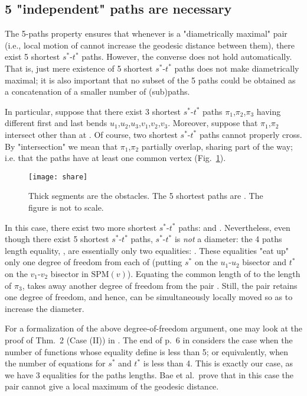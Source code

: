 \documentclass{llncs}
\newif\ifim \imtrue
\newcommand{\e}[1]{\emph{#1}}
\renewcommand\-{\textrm{-}}
\newcommand{\spm}[1]{\ensuremath{\textrm{SPM}(#1)}\xspace}
\renewcommand\ss{\ensuremath{s^*}\xspace}
\renewcommand\tt{\ensuremath{t^*}\xspace}
\newcommand{\uone}{\ensuremath{u_1}\xspace}\newcommand{\utwo}{\ensuremath{u_2}\xspace}\newcommand{\uthree}{\ensuremath{u_3}\xspace}
\newcommand{\vone}{\ensuremath{v_1}\xspace}\newcommand{\vtwo}{\ensuremath{v_2}\xspace}\newcommand{\vthree}{\ensuremath{v_3}\xspace}
\newcommand\pone{\ensuremath{\pi_1}\xspace}\newcommand\ptwo{\ensuremath{\pi_2}\xspace}\newcommand\pthree{\ensuremath{\pi_3}\xspace}
\newcommand\bae{\cite{bae}\xspace}
\begin{document}
\subsection{5 "independent" paths are necessary}

The 5-paths property ensures that whenever  is a "diametrically
maximal" pair \bae (i.e., local motion of  cannot increase the geodesic
distance between them), there exist 5 shortest \ss-\tt paths. However, the
converse does not hold automatically. That is, just mere existence of 5 shortest
\ss-\tt paths does not make  diametrically maximal; it is also
important that no subset of the 5 paths could be obtained as a concatenation of
a smaller number of (sub)paths.

In particular, suppose that there exist 3 shortest \ss-\tt paths
\pone,\ptwo,\pthree having different first and last bends
\uone,\utwo,\uthree,\vone,\vtwo,\vthree. Moreover, suppose that \pone,\ptwo
intersect other than at . Of course, two shortest \ss-\tt paths cannot
properly cross. By "intersection" we mean that \pone,\ptwo partially overlap,
sharing part of the way; i.e. that the paths have at least one common vertex 
(Fig.~\ref{share}).
\begin{figure}\centering
\ifim\texttt{[image: share]}\fi
\caption{Thick segments are the obstacles. The 5 shortest paths are  . The figure is not to scale. }\label{share}
\end{figure}

In this case, there exist two more shortest \ss-\tt paths:
 and .
Nevertheless, even though there exist 5 shortest \ss-\tt paths, \ss-\tt is
\e{not} a diameter: the 4 paths length equality,
, are essentially only two equalities:
. These equalities "eat up" only one
degree of freedom from each of  (putting \ss on the \uone-\utwo bisector
and \tt on the \vone-\vtwo bisector in \spm{v}). Equating the common length of
 to the length of \pthree, takes away another degree of
freedom from the pair . Still, the pair retains one degree of
freedom, and hence,  can be simultaneously locally moved so as to
increase the diameter.

For a formalization of the above degree-of-freedom argument, one may look at the
proof of Thm.~2 (Case (II)) in \bae. The end of p.~6 in \bae considers the case
when the number of functions whose equality define  is less than 5;
or equivalently, when the number of equations for \ss and \tt is less than 4.
This is exactly our case, as we have 3 equalities for the paths lengths. Bae et
al.\ prove that in this case the pair  cannot give a local maximum of
the geodesic distance.
\end{document}

